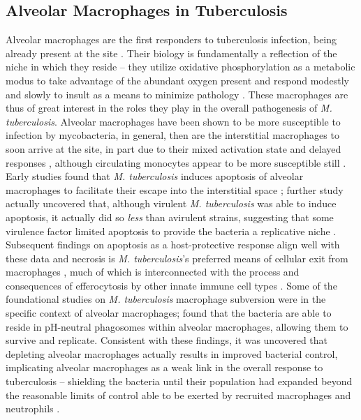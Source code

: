 \subsection{Alveolar Macrophages in Tuberculosis}\label{alvmac}

Alveolar macrophages are the first responders to tuberculosis infection, being already present at the site \citep{Flynn2001}. Their biology is fundamentally a reflection of the niche in which they reside -- they utilize oxidative phosphorylation as a metabolic modus to take advantage of the abundant oxygen present and respond modestly and slowly to insult as a means to minimize pathology \citep{Joshi2018}. These macrophages are thus of great interest in the roles they play in the overall pathogenesis of \textit{M. tuberculosis}. Alveolar macrophages have been shown to be more susceptible to infection by mycobacteria, in general, then are the interstitial macrophages to soon arrive at the site, in part due to their mixed activation state and delayed responses \citep{Kahnert2006, Madden2022}, although circulating monocytes appear to be more susceptible still \citep{Cambier2014b, Cambier2017}. Early studies found that \textit{M. tuberculosis} induces apoptosis of alveolar macrophages to facilitate their escape into the interstitial space \citep{Keane1997}; further study actually uncovered that, although virulent \textit{M. tuberculosis} was able to induce apoptosis, it actually did so \textit{less} than avirulent strains, suggesting that some virulence factor limited apoptosis to provide the bacteria a replicative niche \citep{Keane2000, Cohen2018}. Subsequent findings on apoptosis as a host\hyp{}protective response align well with these data and necrosis is \textit{M. tuberculosis}'s preferred means of cellular exit from macrophages \citep{Behar2011}, much of which is interconnected with the process and consequences of efferocytosis by other innate immune cell types \citep{Martin2012}. Some of the foundational studies on \textit{M. tuberculosis} macrophage subversion were in the specific context of alveolar macrophages; \citet{Mwandumba2004} found that the bacteria are able to reside in pH\hyp{}neutral phagosomes within alveolar macrophages, allowing them to survive and replicate. Consistent with these findings, it was uncovered that depleting alveolar macrophages actually results in improved bacterial control, implicating alveolar macrophages as a weak link in the overall response to tuberculosis -- shielding the bacteria until their population had expanded beyond the reasonable limits of control able to be exerted by recruited macrophages and neutrophils \citep{Leemans2001}. 

